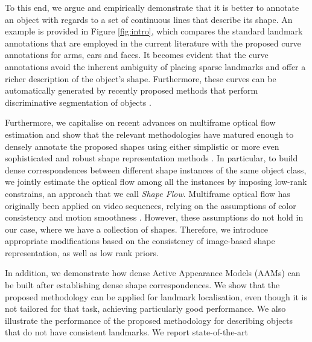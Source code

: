 To this end, we argue and empirically demonstrate that it is better to annotate an object with regards to a set of continuous lines that describe its shape. An example is provided in Figure \ref{fig:intro}, which compares the standard landmark annotations that are employed in the current literature with the proposed curve annotations for arms, ears and faces. It becomes evident that the curve annotations avoid the inherent ambiguity of placing sparse landmarks and offer a richer description of the object's shape.
%
Furthermore, these curves can be automatically generated by recently proposed methods that perform discriminative segmentation of objects \cite{luo2013pedestrian,liu2015matching}.

Furthermore, we capitalise on recent advances on multiframe optical flow estimation \cite{Garg:2013hu} and show that the relevant methodologies have matured enough to densely annotate the proposed shapes using either simplistic or more even sophisticated and robust shape representation methods \cite{Nguyen2013}.
In particular, to build dense correspondences between different shape instances of the same object class, we jointly estimate the optical flow among all the instances by imposing low-rank constrains, an approach that we call \emph{Shape Flow}. Multiframe optical flow has originally been applied on video sequences, relying on the assumptions of color consistency and motion smoothness \cite{Garg:2013hu}. However, these assumptions do not hold in our case, where we have a collection of shapes. Therefore, we introduce appropriate modifications based on the consistency of image-based shape representation, as well as low rank priors.
%

In addition, we demonstrate how dense Active Appearance Models (AAMs) can be built after establishing dense shape correspondences. We show that the proposed methodology can be applied for landmark localisation, even though it is not tailored for that task, achieving particularly good performance. We also illustrate the performance of the proposed methodology for describing objects that do not have consistent landmarks. We report state-of-the-art

